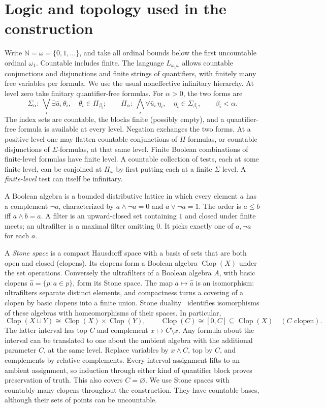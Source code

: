 \documentclass[11pt,letterpaper]{article}
\theoremstyle{definition}\newtheorem{definition}[theorem]{Definition}
\newcommand{\N}{\mathbb N}
\newcommand{\Clop}{\operatorname{Clop}}
\begin{document}
\section{Logic and topology used in the construction}\label{sec:tools}
Write \(\N=\omega=\{0,1,\ldots\}\), and take all ordinal bounds below the first
uncountable ordinal \(\omega_1\). Countable includes finite.
The language \(L_{\omega_1\omega}\) allows countable conjunctions and
disjunctions and finite strings of quantifiers, with finitely many free
variables per formula. We use the usual noneffective infinitary hierarchy.
At level zero take finitary quantifier-free formulas. For \(\alpha>0\),
the two forms are
\[
 \Sigma_\alpha:\ \bigvee_i\exists\bar u_i\,\theta_i,\quad
       \theta_i\in\Pi_{\beta_i};
 \qquad
 \Pi_\alpha:\ \bigwedge_i\forall\bar u_i\,\eta_i,\quad
       \eta_i\in\Sigma_{\beta_i},\qquad \beta_i<\alpha.
\]
The index sets are countable, the blocks finite (possibly empty), and a
quantifier-free formula is available at every level. Negation exchanges the
two forms. At a positive level one may flatten countable conjunctions of
\(\Pi\)-formulas, or countable disjunctions of \(\Sigma\)-formulas, at that
same level. Finite Boolean combinations of finite-level formulas have finite
level. A countable collection of tests, each at some finite level, can be
conjoined at \(\Pi_\omega\) by first putting each at a finite \(\Sigma\)
level. A \emph{finite-level} test can itself be infinitary.

A Boolean algebra is a bounded distributive lattice in which every element
\(a\) has a complement \(\neg a\), characterized by \(a\wedge\neg a=0\)
and \(a\vee\neg a=1\). The order is \(a\le b\) iff \(a\wedge b=a\).
A filter is an upward-closed set containing \(1\) and closed under finite
meets; an ultrafilter is a maximal filter omitting \(0\). It picks exactly
one of \(a,\neg a\) for each \(a\).

A \emph{Stone space} is a compact Hausdorff space with a basis of sets
that are both open and closed (clopens). Its clopens form a Boolean algebra
\(\Clop(X)\) under the set operations. Conversely the ultrafilters of a
Boolean algebra \(A\), with basic clopens \(\widehat a=\{p:a\in p\}\), form
its Stone space. The map \(a\mapsto\widehat a\) is an isomorphism:
ultrafilters separate distinct elements, and compactness turns a covering of
a clopen by basic clopens into a finite union. Stone duality~\cite{stone}
identifies isomorphisms of these algebras with homeomorphisms of their
spaces. In particular,
\[
 \Clop(X\sqcup Y)\cong\Clop(X)\times\Clop(Y),\qquad
 \Clop(C)\cong[0,C]\subseteq\Clop(X)\quad(C\text{ clopen}).
\]
The latter interval has top \(C\) and complement \(x\mapsto C\setminus x\).
Any formula about the interval can be translated to one about the ambient
algebra with the additional parameter \(C\), at the same level. Replace
variables by \(x\wedge C\), top by \(C\), and complements by relative
complements. Every interval assignment lifts to an ambient assignment,
so induction through either kind of quantifier block proves preservation
of truth. This also covers \(C=\varnothing\).
We use Stone spaces with countably many clopens throughout the construction.
They have countable bases, although their sets of points can be uncountable.
\end{document}
